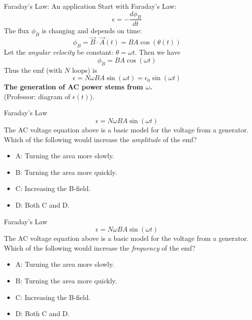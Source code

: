 \documentclass{beamer}
\begin{document}
\begin{frame}{Faraday's Law: An application}
Start with Faraday's Law:
\begin{equation}
\epsilon = - \frac{d\phi_B}{dt}
\end{equation}
The flux $\phi_B$ is changing and depends on time:
\begin{equation}
\phi_B = \vec{B} \cdot \vec{A}(t) = BA\cos(\theta(t))
\end{equation}
Let the \textit{angular velocity} be constant: $\theta = \omega t$.  Then we have
\begin{equation}
\phi_B  = BA\cos(\omega t)
\end{equation}
Thus the emf (with $N$ loops) is
\begin{equation}
\epsilon = N\omega BA \sin(\omega t) = \epsilon_0 \sin(\omega t)
\end{equation}
\textbf{The generation of AC power stems from $\omega$.} \\ (Professor: diagram of $\epsilon(t)$).
\end{frame}

\begin{frame}{Faraday's Law}
\begin{equation}
\epsilon = N\omega BA \sin(\omega t)
\end{equation}
The AC voltage equation above is a basic model for the voltage from a generator.  Which of the following would increase the \textit{amplitude} of the emf?
\begin{itemize}
\item A: Turning the area more slowly.
\item B: Turning the area more quickly.
\item C: Increasing the B-field.
\item D: Both C and D.
\end{itemize}
\end{frame}

\begin{frame}{Faraday's Law}
\begin{equation}
\epsilon = N\omega BA \sin(\omega t)
\end{equation}
The AC voltage equation above is a basic model for the voltage from a generator.  Which of the following would increase the \textit{frequency} of the emf?
\begin{itemize}
\item A: Turning the area more slowly.
\item B: Turning the area more quickly.
\item C: Increasing the B-field.
\item D: Both C and D.
\end{itemize}
\end{frame}
\end{document}
